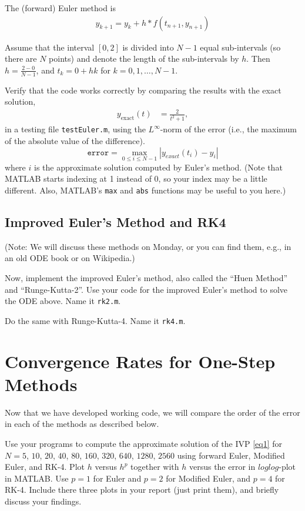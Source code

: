 \documentclass[final,11pt]{article}
\begin{document}
The (forward) Euler method is
\begin{align*}
 y_{k+1} = y_k + h*f(t_{n+1},y_{n+1})
\end{align*}

Assume that the interval $[0,2]$ is divided into $N-1$ equal sub-intervals (so there are $N$ points)
and  denote the length of the sub-intervals by $h$. Then 
$h=\frac{2-0}{N-1}$, and $t_k = 0+hk$ for $k=0,1,\ldots,N-1$.

Verify that the code works correctly by comparing the results
with the exact solution, 
\begin{align*}
y_{\text{exact}}(t) &= \frac{2}{t^2+1},
\end{align*}
in a testing file \texttt{testEuler.m}, using the $L^\infty$-norm of the error (i.e., the maximum of the absolute value of the difference).
\[\texttt{error} = \max_{0\leq i\leq N-1}|y_{exact}(t_i)-y_i|\]
where $i$ is the approximate solution computed by Euler's method.  (Note that MATLAB starts indexing at 1 instead of 0, so your index may be a little different.  Also, MATLAB's \texttt{max} and \texttt{abs} functions may be useful to you here.)


\subsection{Improved Euler's Method and RK4}
(Note: We will discuss these methods on Monday, or you can find them, e.g., in an old ODE book or on Wikipedia.)

\bigskip

Now, implement the improved Euler's method, also called the ``Huen Method'' and ``Runge-Kutta-2''. Use your code for the improved Euler's method to solve the ODE above.  Name it \texttt{rk2.m}.

\bigskip

\noindent Do the same with Runge-Kutta-4.  Name it \texttt{rk4.m}.




\section{Convergence Rates for One-Step Methods}
\label{subsec:conv_euler}

Now that we have developed working code, we will compare the order of the 
error in each of the methods as described below.

 
Use your programs to compute the 
approximate solution of the IVP \eqref{eq1}
for $N=5$, $10$, $20$, $40$, $80$, $160$, $320$, $640$, $1280$,
$2560$ using forward Euler, Modified Euler, and RK-4.  
Plot $h$ versus $h^{p}$ together with $h$ versus the error 
in $loglog$-plot in MATLAB.
Use $p =1$ for Euler
and $p=2$ for Modified Euler, and $p=4$ for RK-4. Include there three plots
in your report (just print them), and briefly discuss your findings.
\end{document}
